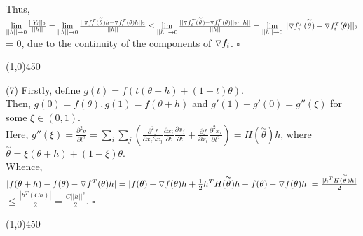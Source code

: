\documentclass[12pt]{article}
\begin{document}
\noindent
Thus, $\lim\limits_{||h||\to 0} \frac{||Y_i||_2}{||h||}
= \lim\limits_{||h||\to 0} \frac{||\triangledown f_i^T(\overset{\sim}\theta)h-\triangledown f_i^T(\theta)h||_2}{||h||}
\leq \lim\limits_{||h||\to 0} \frac{||\triangledown f_i^T(\overset{\sim}\theta)-\triangledown f_i^T(\theta)||_2 \cdot ||h||}{||h||}
= \lim\limits_{||h||\to 0} ||\triangledown f_i^T(\overset{\sim}\theta)-\triangledown f_i^T(\theta)||_2$\\
\indent\indent\indent = 0, due to the continuity of the components of $\triangledown f_i$. $\square$

\begin{center}
\line(1,0){450}
\end{center}


\noindent
(7) Firstly, define $g(t) = f(t(\theta+h)+(1-t)\theta).$\\
Then, $g(0) = f(\theta), g(1) = f(\theta+h)$ and $g'(1)-g'(0) = g''(\xi)$ for some $\xi \in (0,1)$.\\
Here, $g''(\xi) = \frac{\partial^2 g}{\partial t^2} 
= \sum_i \sum_j (\frac{\partial^2 f}{\partial x_i \partial x_j} \frac{\partial x_i}{\partial t} \frac{\partial x_j}{\partial t} 
+ \frac{\partial f}{\partial x_i} \frac{\partial^2 x_i}{\partial t^2}) 
= H(\overset{\sim}\theta)h$, where $\overset{\sim}\theta = \xi(\theta+h)+(1-\xi)\theta$.\\

\noindent
Whence, $|f(\theta+h)-f(\theta)-\triangledown f^T(\theta)h| 
= |f(\theta)+\triangledown f(\theta)h+\frac{1}{2}h^TH(\overset{\sim}\theta)h-f(\theta)-\triangledown f(\theta) h| 
= \frac{|h^T H(\overset{\sim}\theta) h|}{2}$\\
\indent\indent $\leq \frac{|h^T (C h)|}{2} = \frac{C ||h||^2}{2}.$ $\square$

\begin{center}
\line(1,0){450}
\end{center}
\end{document}
